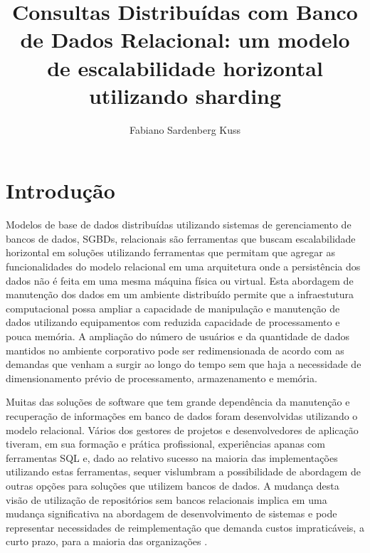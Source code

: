 \documentclass[12pt, a4paper]{article}
\begin{document}
\onehalfspace

\title{Consultas Distribuídas com Banco de Dados Relacional: um modelo de escalabilidade horizontal utilizando sharding}
\author{Fabiano Sardenberg Kuss}





\section{Introdução}

Modelos de base de dados distribuídas utilizando sistemas de gerenciamento de bancos de dados, SGBDs, relacionais são
ferramentas que buscam escalabilidade horizontal em soluções utilizando ferramentas que permitam que agregar 
as funcionalidades do modelo relacional em uma arquitetura onde a persistência dos dados não é feita em
uma mesma máquina física ou virtual. Esta abordagem de manutenção dos dados em um ambiente distribuído 
permite que a infraestutura computacional possa ampliar a capacidade de manipulação e manutenção de dados 
utilizando equipamentos com reduzida capacidade de processamento e pouca memória.
A ampliação do número de usuários e da quantidade de dados mantidos no ambiente corporativo pode
ser redimensionada de acordo com as demandas que venham a surgir ao longo do tempo sem que haja a necessidade
de dimensionamento prévio de processamento, armazenamento e memória.

Muitas das soluções de software que tem grande dependência da manutenção e recuperação de informações
em banco de dados foram desenvolvidas utilizando o modelo relacional. Vários dos gestores de projetos 
e desenvolvedores de aplicação tiveram, em sua formação e prática profissional, experiências apanas
com ferramentas SQL e, dado ao relativo sucesso na maioria das implementações utilizando estas ferramentas,
sequer vislumbram a possibilidade de abordagem de outras opções para soluções que utilizem 
bancos de dados. A mudança desta visão de utilização de repositórios sem bancos relacionais
implica em uma mudança significativa na abordagem de desenvolvimento de sistemas e pode representar
necessidades de reimplementação que demanda custos impraticáveis, a curto prazo, para a maioria das
organizações \cite{Tran_KLF_11}.
\end{document}
